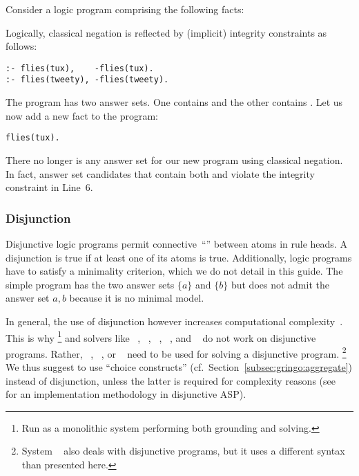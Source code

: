 \begin{example}\label{ex:flies:neg}
Consider a logic program comprising the following facts:
%


%
Logically, classical negation is reflected by
(implicit) integrity constraints as follows:%
%
\begin{lstlisting}[firstnumber=6]
:- flies(tux),    -flies(tux).
:- flies(tweety), -flies(tweety).
\end{lstlisting}
The program has two answer sets.
One contains  and the other contains .
Let us now add a new fact to the program:
\begin{lstlisting}[firstnumber=8]
flies(tux).
\end{lstlisting}
There no longer is any answer set for our new program using classical negation.
In fact, answer set candidates that contain both
 and
 violate the integrity constraint in Line~6.
\eexample
\end{example}


\subsubsection{Disjunction}\label{subsec:gringo:disjunction}
Disjunctive logic programs permit connective~``\code{|}'' between atoms in rule heads.
A disjunction is true if at least one of its atoms is true.
Additionally, logic programs have to satisfy a minimality criterion, 
which we do not detail in this guide.
The simple program  has the two answer sets $\{a\}$ and $\{b\}$ but
does not admit the answer set ${a,b}$ because it is no minimal model.

In general, the use of disjunction however increases
computational complexity~\cite{eitgot95a}.
This is why \clingo%
\footnote{Run as a monolithic system performing both grounding and solving.}
and solvers like 
\assat~\cite{linzha04a},
\clasp~\cite{gekanesc07b},
\nomorepp~\cite{angelinesc05c},
\smodels~\cite{siniso02a}, and
\smodelscc~\cite{warsch04a}
do not work on disjunctive programs.
Rather,
\claspD~\cite{drgegrkakoossc08a},
\cmodels~\cite{gilima06a,lierler05a}, or
\gnt~\cite{janisesiyo06a}
need to be used for solving a disjunctive program.%
\footnote{System \dlv~\cite{dlv03a} also deals with disjunctive programs,
  but it uses a different syntax than presented here.}
We thus suggest to use ``choice constructs'' (cf.\ Section~\ref{subsec:gringo:aggregate})
instead of disjunction, unless the latter is required for complexity reasons
(see~\cite{eitpol06a} for an implementation methodology in disjunctive ASP).


